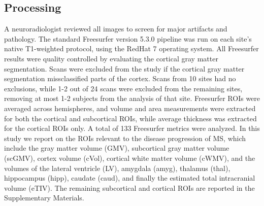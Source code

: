 \subsection{Processing}
 A neuroradiologist reviewed all images to screen for major artifacts and pathology. The standard Freesurfer\cite{freesurferPaper} version 5.3.0 pipeline was run on each site's native T1-weighted protocol, using the RedHat 7 operating system. All Freesurfer results were quality controlled by evaluating the cortical gray matter segmentation. Scans were excluded from the study if the cortical gray matter segmentation missclassified parts of the cortex. Scans from 10 sites had no exclusions, while 1-2 out of 24 scans were excluded from the remaining sites, removing at most 1-2 subjects from the analysis of that site. Freesurfer ROIs were averaged across hemispheres, and volume and area measurements were extracted for both the cortical and subcortical ROIs, while average thickness was extracted for the cortical ROIs only. A total of 133 Freesurfer metrics were analyzed. In this study we report on the ROIs relevant to the disease progression of MS, which include the gray matter volume (GMV), subcortical gray matter volume (scGMV), cortex volume (cVol), cortical white matter volume (cWMV), and the volumes of the lateral ventricle (LV), amygdala (amyg), thalamus (thal), hippocampus (hipp), caudate (caud), and finally the estimated total intracranial volume (eTIV). The remaining subcortical  and cortical ROIs are reported in the Supplementary Materials.
